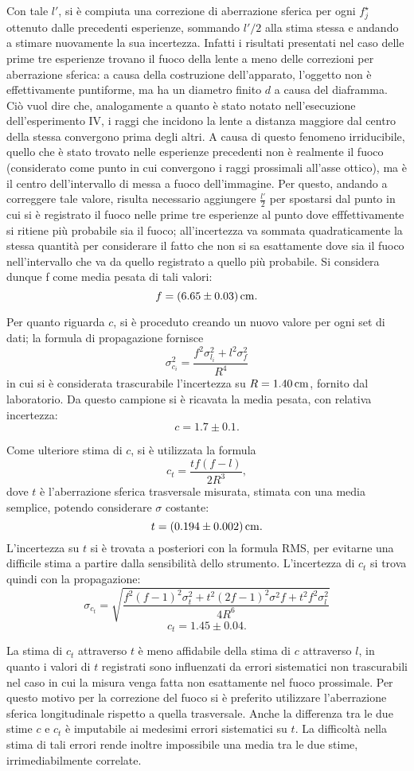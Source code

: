 Con tale $l'$, si \`e compiuta una correzione di aberrazione sferica per ogni $f^{\star}_j$ ottenuto dalle precedenti esperienze, sommando $l'/2$ alla stima stessa e andando a stimare nuovamente la sua incertezza. Infatti i risultati presentati nel caso delle prime tre esperienze trovano il fuoco della lente a meno delle correzioni per aberrazione sferica: a causa della costruzione dell'apparato, l'oggetto non è effettivamente puntiforme, ma ha un diametro finito $d$ a causa del diaframma. Ciò vuol dire che, analogamente a quanto è stato notato nell'esecuzione dell'esperimento IV, i raggi che incidono la lente a distanza maggiore dal centro della stessa convergono prima degli altri. A causa di questo fenomeno irriducibile, quello che è stato trovato nelle esperienze precedenti non è realmente il fuoco (considerato come punto in cui convergono i raggi prossimali all'asse ottico), ma è il centro dell'intervallo di messa a fuoco dell'immagine. Per questo, andando a correggere tale valore, risulta necessario aggiungere $\frac{l'}{2}$ per spostarsi dal punto in cui si \`e registrato il fuoco nelle prime tre esperienze al punto dove efffettivamente si ritiene più probabile sia il fuoco; all'incertezza va sommata quadraticamente la stessa quantità per considerare il fatto che non si sa esattamente dove sia il fuoco nell'intervallo che va da quello registrato a quello pi\`u probabile. Si considera dunque f come media pesata di tali valori:
\[ f = (6.65 \pm 0.03) \,\mathrm{cm}. \] 


Per quanto riguarda $c$, si \`e proceduto creando un nuovo valore per ogni set di dati; la formula di propagazione fornisce 
\[  \sigma^2_{c_i} =\frac{f^2    \sigma^2_{l_i} + l^2    \sigma^2_{f}}{R^4} \]
in cui si \`e considerata trascurabile l'incertezza su $R=1.40\,\mathrm{cm}$, fornito dal laboratorio.
Da questo campione si \`e ricavata la media pesata, con relativa incertezza:
\[ c = 1.7 \pm 0.1. \] 



Come ulteriore stima di $c$, si \`e utilizzata la formula
\[ c_t = \frac{t   f   (f-l)}{2R^3}, \]
dove $t$ \`e l'aberrazione sferica trasversale misurata, stimata con una media semplice, potendo considerare $\sigma$ costante:
\[ t = (0.194 \pm 0.002) \,\mathrm{cm}.\]
L'incertezza su $t$ si \`e trovata a posteriori con la formula RMS, per evitarne una difficile stima a partire dalla sensibilit\`a dello strumento. 
L'incertezza di $c_t$ si trova quindi con la propagazione: 
\[ \sigma_{c_t} = \sqrt{ \frac
{ f^2   (f-1)^2    \sigma^2_{t}  +  t^2   (2f-1)^2    \sigma^2{f}  +  t^2   f^2    \sigma^2_{l}}
{4R^6}
}   \]
\[c_t = 1.45 \pm 0.04. \]


La stima di $c_t$ attraverso $t$ \`e meno affidabile della stima di $c$ attraverso $l$, in quanto i valori di $t$ registrati sono influenzati da errori sistematici non trascurabili nel caso in cui la misura venga fatta non esattamente nel fuoco prossimale. Per questo motivo per la correzione del fuoco si \`e preferito utilizzare l'aberrazione sferica longitudinale rispetto a quella trasversale.
Anche la differenza tra le due stime $c$ e $c_t$ \`e imputabile ai medesimi errori sistematici su $t$. La difficolt\`a nella stima di tali errori rende inoltre impossibile una media tra le due stime, irrimediabilmente correlate.
